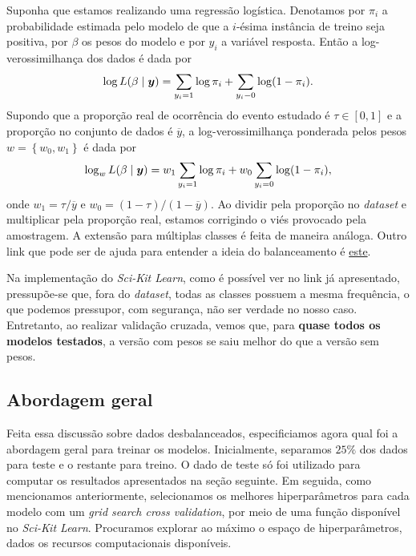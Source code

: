 Suponha que estamos realizando uma regressão logística.
Denotamos por \( \pi_{ i } \) a probabilidade estimada pelo modelo de que a \( i \)-ésima instância de treino seja positiva, por \( \beta \) os pesos do modelo e por \( y_{ i } \) a variável resposta.
Então a log-verossimilhança dos dados é dada por
\begin{equation*}
    \log L ( \beta \mid \boldsymbol{y} ) = \sum_{ y_{ i } = 1 } \log \pi_{ i }
    + \sum_{ y_{ i } - 0 } \log ( 1 - \pi_{ i } )
.\end{equation*}
Supondo que a proporção real de ocorrência do evento estudado é \( \tau \in [0, 1] \) e a proporção no conjunto de dados é \( \overline{ y } \), a log-verossimilhança ponderada pelos pesos \( w = \left\{ w_{ 0 }, w_{ 1 } \right\} \) é dada por
\begin{equation*}
    \log_{ w } L ( \beta \mid \boldsymbol{y} ) =
    w_{ 1 } \sum_{ y_{ i } = 1 } \log \pi_{ i } + w_{ 0 } \sum_{ y_{ i } = 0 } \log ( 1 - \pi_{ i } )
,\end{equation*}
onde \( w_{ 1 } = \tau / \overline{ y } \) e \( w_{ 0 } = ( 1 - \tau ) / ( 1 - \overline{ y } ) \).
Ao dividir pela proporção no \emph{dataset} e multiplicar pela proporção real, estamos corrigindo o viés provocado pela amostragem.
A extensão para múltiplas classes é feita de maneira análoga.
Outro link que pode ser de ajuda para entender a ideia do balanceamento é \href{https://github.com/scikit-learn/scikit-learn/issues/4324}{este}.

Na implementação do \emph{Sci-Kit Learn}, como é possível ver no link já apresentado, pressupõe-se que, fora do \emph{dataset}, todas as classes possuem a mesma frequência, o que podemos pressupor, com segurança, não ser verdade no nosso caso.
Entretanto, ao realizar validação cruzada, vemos que, para \textbf{quase todos os modelos testados}, a versão com pesos se saiu melhor do que a versão sem pesos.

\subsection{Abordagem geral}

Feita essa discussão sobre dados desbalanceados, especificiamos agora qual foi a abordagem geral para treinar os modelos.
Inicialmente, separamos \( 25\% \) dos dados para teste e o restante para treino.
O dado de teste só foi utilizado para computar os resultados apresentados na seção seguinte.
Em seguida, como mencionamos anteriormente, selecionamos os melhores hiperparâmetros para cada modelo com um \emph{grid search cross validation}, por meio de uma função disponível no \emph{Sci-Kit Learn}.
Procuramos explorar ao máximo o espaço de hiperparâmetros, dados os recursos computacionais disponíveis.
